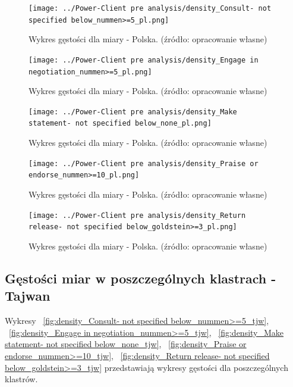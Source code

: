 \documentclass[11pt]{report}
\begin{document}
    \begin{figure}[!htp]
        \centering
        \texttt{[image: ../Power-Client pre analysis/density\_Consult- not specified below\_nummen>=5\_pl.png]}
        \caption{Wykres gęstości dla miary - Polska. (źródło: opracowanie własne)}
        \label{fig:density_Consult- not specified below_nummen>=5_pl}
    \end{figure}
    \begin{figure}[!htp]
        \centering
        \texttt{[image: ../Power-Client pre analysis/density\_Engage in negotiation\_nummen>=5\_pl.png]}
        \caption{Wykres gęstości dla miary - Polska. (źródło: opracowanie własne)}
        \label{fig:density_Engage in negotiation_nummen>=5_pl}
    \end{figure}
    \begin{figure}[!htp]
        \centering
        \texttt{[image: ../Power-Client pre analysis/density\_Make statement- not specified below\_none\_pl.png]}
        \caption{Wykres gęstości dla miary - Polska. (źródło: opracowanie własne)}
        \label{fig:density_Make statement- not specified below_none_pl}
    \end{figure}
    \begin{figure}[!htp]
        \centering
        \texttt{[image: ../Power-Client pre analysis/density\_Praise or endorse\_nummen>=10\_pl.png]}
        \caption{Wykres gęstości dla miary - Polska. (źródło: opracowanie własne)}
        \label{fig:density_Praise or endorse_nummen>=10_pl}
    \end{figure}
    \begin{figure}[!htp]
        \centering
        \texttt{[image: ../Power-Client pre analysis/density\_Return release- not specified below\_goldstein>=3\_pl.png]}
        \caption{Wykres gęstości dla miary - Polska. (źródło: opracowanie własne)}
        \label{fig:density_Return release- not specified below_goldstein>=3_pl}
    \end{figure}

    \subsection{Gęstości miar w poszczególnych klastrach - Tajwan}\label{subsec:gęstośc-miar-w-poszczególnych-klastrach---tajwan}

    Wykresy
    ~\ref{fig:density_Consult- not specified below_nummen>=5_tjw},
    ~\ref{fig:density_Engage in negotiation_nummen>=5_tjw},
    ~\ref{fig:density_Make statement- not specified below_none_tjw},
    ~\ref{fig:density_Praise or endorse_nummen>=10_tjw},
    ~\ref{fig:density_Return release- not specified below_goldstein>=3_tjw}
    przedstawiają wykresy gęstości dla poszczególnych klastrów.
\end{document}
